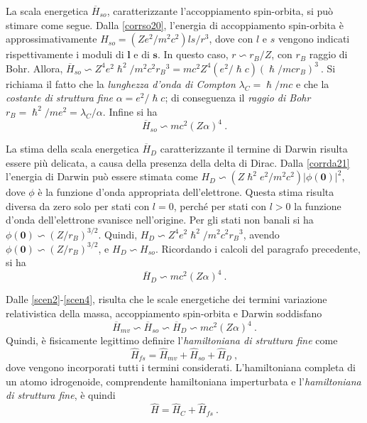 \documentclass[12pt,a4paper]{report}
\numberwithin{equation}{section}
\numberwithin{section}{chapter}
\begin{document}
	La scala energetica $\overline{H}_{so}$, caratterizzante l'accoppiamento spin-orbita, si pu\`o stimare come segue. Dalla \eqref{corrso20}, l'energia di accoppiamento spin-orbita \`e approssimativamente $H_{so} = (Ze^2/m^2c^2)ls/r^3$, dove con $l$ e $s$ vengono indicati rispettivamente i moduli di $\boldsymbol{l}$ e di $\boldsymbol{s}$. In questo caso, $r \backsim r_B/Z$, con $r_B$ raggio di Bohr. Allora, $\overline{H}_{so} \backsim Z^4e^2\hslash^2/m^2c^2{r_B}^3 = mc^2Z^4(e^2/\hslash c)(\hslash/mcr_B)^3~$. Si richiama il fatto che la \textit{lunghezza d'onda di Compton} $\lambda_C = \hslash/mc$ e che la \textit{costante di struttura fine} $\alpha = e^2/\hslash c$; di conseguenza il \textit{raggio di Bohr} $r_B = \hslash^2/me ^2 = \lambda_C/\alpha$. Infine si ha
	\begin{equation}
	\label{scen3}
	\overline{H}_{so} \backsim mc^2(Z\alpha)^4~.
	\end{equation}
	
	La stima della scala energetica $\overline{H}_D$ caratterizzante il termine di Darwin risulta essere pi\`u delicata, a causa della presenza della delta di Dirac. Dalla \eqref{corrda21} l'energia di Darwin pu\`o essere stimata come $H_D \backsim (Z\hslash^2e^2/m^2c^2)|\phi(\boldsymbol{0})|^2$, dove $\phi$ \`e la funzione d'onda appropriata dell'elettrone. Questa stima risulta diversa da zero solo per stati con $l = 0$, perch\'e per stati con $l > 0$ la funzione d'onda dell'elettrone svanisce nell'origine. Per gli stati non banali si ha $\phi(\boldsymbol{0}) \backsim (Z/r_B)^{3/2}$. Quindi, $H_D \backsim Z^4e^2\hslash^2/m^2c^2{r_B}^3$, avendo $\phi(\boldsymbol{0}) \backsim (Z/r_B)^{3/2}$, e $H_D \backsim H_{so}$. Ricordando i calcoli del paragrafo precedente, si ha
	\begin{equation}
	\label{scen4}
	\overline{H}_D \backsim mc^2(Z\alpha)^4~.
	\end{equation}
	
	Dalle \eqref{scen2}-\eqref{scen4}, risulta che le scale energetiche dei termini variazione relativistica della massa, accoppiamento spin-orbita e Darwin soddisfano
	\begin{equation}
	\label{scen5}
	\overline{H}_{mv} \backsim \overline{H}_{so} \backsim \overline{H}_D \backsim mc^2(Z\alpha)^4~.
	\end{equation}
	Quindi, \`e fisicamente legittimo definire l'\textit{hamiltoniana di struttura fine} come
	\begin{equation}
	\label{scen6}
	\widehat{H}_{fs} = \widehat{H}_{mv} + \widehat{H}_{so} + \widehat{H}_D~,
	\end{equation}
	dove vengono incorporati tutti i termini considerati. L'hamiltoniana completa di un atomo idrogenoide, comprendente hamiltoniana imperturbata e l'\textit{hamiltoniana di struttura fine}, \`e quindi
	\begin{equation}
	\label{scen7}
	\widehat{H} = \widehat{H}_C + \widehat{H}_{fs}~.
	\end{equation}
	
\end{document}
